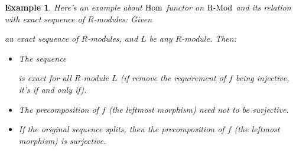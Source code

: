 \documentclass[x11names,reqno,12pt]{extarticle}
\newtheorem{exm}{Example}
\newcommand{\Hom}{\textmd{Hom}}
\begin{document}
\begin{exm}
    Here's an example about $\Hom$ functor on $\textmd{R-Mod}$ and its relation with exact sequence of $R$-modules: Given  an exact sequence of $R$-modules, and $L$ be any $R$-module. Then:
    \begin{itemize}
        \item[(1)] The sequence  is exact for all $R$-module $L$ (if remove the requirement of $f$ being injective, it's if and only if).
        \item[(2)] The precomposition of $f$ (the leftmost morphism) need not to be surjective.
        \item[(3)] If the original sequence splits, then the precomposition of $f$ (the leftmost morphism) is surjective.
    \end{itemize}
\end{exm}
\end{document}
